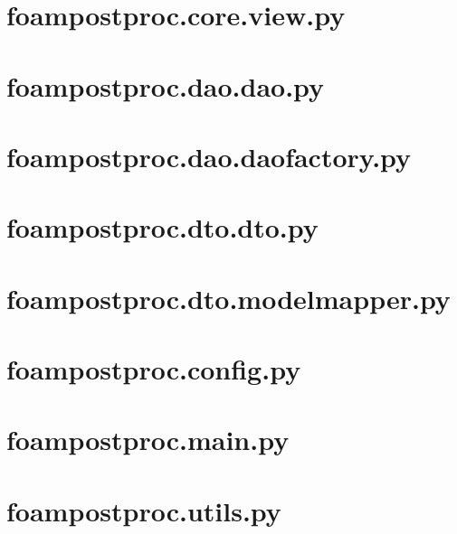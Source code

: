 \documentclass[14pt]{extreport}
\begin{document}
\section{foampostproc.core.view.py}

\section{foampostproc.dao.dao.py}

\section{foampostproc.dao.daofactory.py}

\section{foampostproc.dto.dto.py}

\section{foampostproc.dto.modelmapper.py}

\section{foampostproc.config.py}

\section{foampostproc.main.py}

\section{foampostproc.utils.py}

\end{document}
